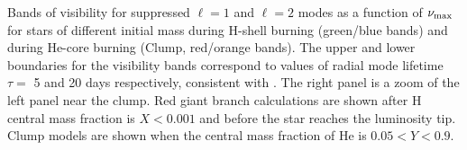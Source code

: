 \label{fig:visibility} Bands of visibility for suppressed $\ell=1$ and $\ell=2$ modes as a function of $\nu_{\rm max}$ for stars of different initial mass during H-shell burning (green/blue bands) and during He-core burning (Clump, red/orange bands). The upper and lower boundaries for the visibility bands correspond to values of radial mode lifetime $\tau=$ 5 and 20 days respectively, consistent with \cite{Dupret_2009,Corsaro_2015}. The right panel is a zoom of the left panel near the clump. Red giant branch calculations are shown after H central mass fraction is $ X < 0.001$ and before the star reaches the luminosity tip. Clump models are shown when the central mass fraction of He is $0.05 < Y < 0.9$.

  
  
  
  
  